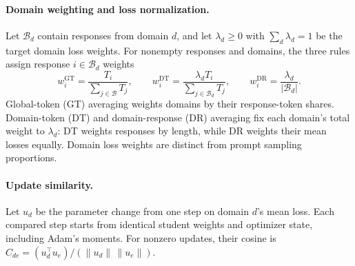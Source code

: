 \paragraph{Domain weighting and loss normalization.}
Let $\mathcal B_d$ contain responses from domain $d$, and let $\lambda_d\geq0$ with $\sum_d\lambda_d=1$ be the target domain loss weights. For nonempty responses and domains, the three rules assign response $i\in\mathcal B_d$ weights
\begin{equation}
w_i^{\mathrm{GT}}=\frac{T_i}{\sum_{j\in\mathcal B}T_j},\qquad
w_i^{\mathrm{DT}}=\frac{\lambda_d T_i}{\sum_{j\in\mathcal B_d}T_j},\qquad
w_i^{\mathrm{DR}}=\frac{\lambda_d}{|\mathcal B_d|}.
\label{eq:averaging}
\end{equation}
Global-token (GT) averaging weights domains by their response-token shares. Domain-token (DT) and domain-response (DR) averaging fix each domain's total weight to $\lambda_d$: DT weights responses by length, while DR weights their mean losses equally. Domain loss weights are distinct from prompt sampling proportions.

\paragraph{Update similarity.}
Let $u_d$ be the parameter change from one step on domain $d$'s mean loss. Each compared step starts from identical student weights and optimizer state, including Adam's moments. For nonzero updates, their cosine is $C_{de}=(u_d^\top u_e)/(\|u_d\|\,\|u_e\|)$.

